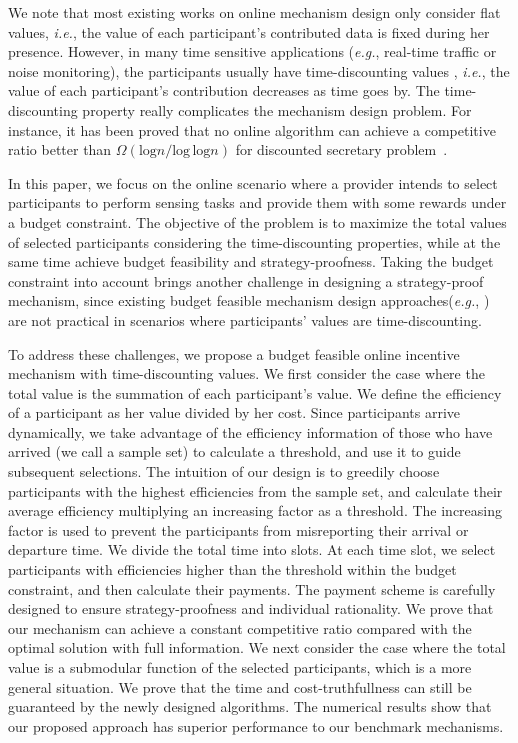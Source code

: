 \documentclass[conference,compsocconf,letterpaper,10pt]{IEEEtran}
\newcommand{\ie}{{\em i.e.}}
\newcommand{\eg}{{\em e.g.}}
\begin{document}
We note that most existing works on online mechanism design only consider flat values, \ie, the value of each participant's contributed data is fixed during her presence. However, in many time sensitive applications (\eg, real-time traffic or noise monitoring), the participants usually have time-discounting values \cite{babaioff2009secretary, wu2014strategy}, \ie, the value of each participant's contribution decreases as time goes by. The time-discounting property really complicates the mechanism design problem. For instance, it has been proved that no online algorithm can achieve a competitive ratio better than $\Omega(\textrm{log}n/\textrm{log}\,\textrm{log}n)$ for discounted secretary problem~\cite{babaioff2009secretary}.


In this paper, we focus on the online scenario where a provider intends to select participants to perform sensing tasks and provide them with some rewards under a budget constraint. The objective of the problem is to maximize the total values of selected participants considering the time-discounting properties, while at the same time achieve budget feasibility and strategy-proofness. Taking the budget constraint into account brings another challenge in designing a strategy-proof mechanism, since existing budget feasible mechanism design approaches(\eg, \cite{singer2010budget, chen2011approximability,Bei:2012:BFM:2213977.2214020,Chen:2011:ABF:2133036.2133090}) are not practical in scenarios where participants' values are time-discounting.

To address these challenges, we propose a budget feasible online incentive mechanism with time-discounting values. We first consider the case where the total value is the summation of each participant's value. We define the efficiency of a participant as her value divided by her cost. Since participants arrive dynamically, we take advantage of the efficiency information of those who have arrived (we call a sample set) to calculate a threshold, and use it to guide subsequent selections. The intuition of our design is to greedily choose participants with the highest efficiencies from the sample set, and calculate their average efficiency multiplying an increasing factor as a threshold. The increasing factor is used to prevent the participants from misreporting their arrival or departure time. We divide the total time into slots. At each time slot, we select participants with efficiencies higher than the threshold within the budget constraint, and then calculate their payments. The payment scheme is carefully designed to ensure strategy-proofness and individual rationality. We prove that our mechanism can achieve a constant competitive ratio compared with the optimal solution with full information. We next consider the case where the total value is a submodular function of the selected participants, which is a more general situation. We prove that the time and cost-truthfullness can still be guaranteed by the newly designed algorithms. The numerical results show that our proposed approach has superior performance to our benchmark mechanisms.
\end{document}
